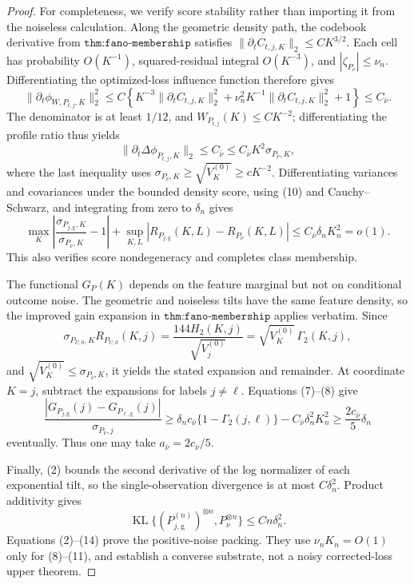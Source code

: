 \documentclass{article}
\begin{document}
\begin{proof}
For completeness, we verify score stability rather than importing it from the noiseless calculation.  Along the geometric density path, the codebook derivative from \(\texttt{thm:fano-membership}\) satisfies \(\|\partial_tC_{t,j,K}\|_2\leq CK^{3/2}\).  Each cell has probability \(O(K^{-1})\), squared-residual integral \(O(K^{-3})\), and \(|\zeta_{P_\nu}|\leq\nu_n\).  Differentiating the optimized-loss influence function therefore gives
\[
 \|\partial_t\phi_{W,P_{t,j},K}\|_2^2
 \leq C\left\{K^{-3}\|\partial_tC_{t,j,K}\|_2^2
 +\nu_n^2K^{-1}\|\partial_tC_{t,j,K}\|_2^2+1\right\}
 \leq C_{\bar\nu}.                                                                      \tag{9}
\]
The denominator is at least \(1/12\), and \(W_{P_{t,j}}(K)\leq CK^{-2}\); differentiating the profile ratio thus yields
\[
 \|\partial_t\Delta\phi_{P_{t,j},K}\|_2
 \leq C_{\bar\nu}\leq C_{\bar\nu}K^2\sigma_{P_\nu,K},                              \tag{10}
\]
where the last inequality uses \(\sigma_{P_\nu,K}\geq\sqrt{V_K^{(0)}}\geq cK^{-2}\).  Differentiating variances and covariances under the bounded density score, using (10) and Cauchy--Schwarz, and integrating from zero to \(\delta_n\) gives
\[
 \max_K\left|\frac{\sigma_{P_{j,\mathrm g},K}}{\sigma_{P_\nu,K}}-1\right|
 +\sup_{K,L}|R_{P_{j,\mathrm g}}(K,L)-R_{P_\nu}(K,L)|
 \leq C_{\bar\nu}\delta_nK_n^2=o(1).                                                   \tag{11}
\]
This also verifies score nondegeneracy and completes class membership.

The functional \(G_P(K)\) depends on the feature marginal but not on conditional outcome noise.  The geometric and noiseless tilts have the same feature density, so the improved gain expansion in \(\texttt{thm:fano-membership}\) applies verbatim.  Since
\[
 \sigma_{P_{U,0},K}R_{P_{U,0}}(K,j)
 =\frac{144H_2(K,j)}{\sqrt{V_j^{(0)}}}
 =\sqrt{V_K^{(0)}}\,\Gamma_2(K,j),                                                       \tag{12}
\]
and \(\sqrt{V_K^{(0)}}\leq\sigma_{P_\nu,K}\), it yields the stated expansion and remainder.  At coordinate \(K=j\), subtract the expansions for labels \(j\ne\ell\).  Equations (7)--(8) give
\[
 \frac{|G_{P_{j,\mathrm g}}(j)-G_{P_{\ell,\mathrm g}}(j)|}{\sigma_{P_\nu,j}}
 \geq\delta_n c_{\bar\nu}\{1-\Gamma_2(j,\ell)\}
 -C_{\bar\nu}\delta_n^2K_n^2
 \geq\frac{2c_{\bar\nu}}5\delta_n                                                     \tag{13}
\]
eventually.  Thus one may take \(a_{\bar\nu}=2c_{\bar\nu}/5\).

Finally, (2) bounds the second derivative of the log normalizer of each exponential tilt, so the single-observation divergence is at most \(C\delta_n^2\).  Product additivity gives
\[
 \operatorname{KL}\{(P_{j,\mathrm g}^{(n)})^{\otimes n},P_\nu^{\otimes n}\}
 \leq Cn\delta_n^2.                                                                     \tag{14}
\]
Equations (2)--(14) prove the positive-noise packing.  They use \(\nu_nK_n=O(1)\) only for (8)--(11), and establish a converse substrate, not a noisy corrected-loss upper theorem.
\end{proof}
\end{document}
